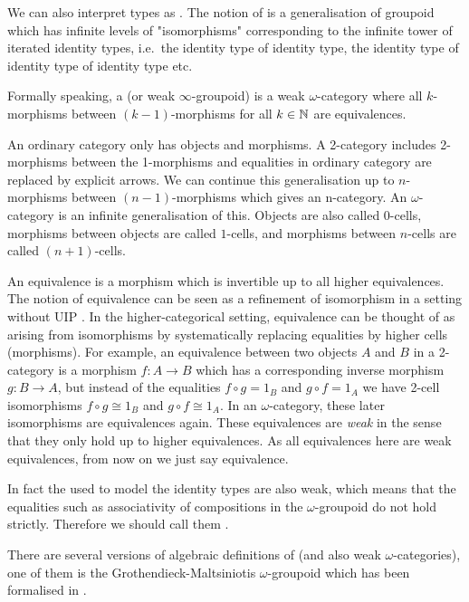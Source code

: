 We can also interpret types as \textbf{\wog}.
The notion of \ogs is a generalisation of groupoid which has infinite levels of "isomorphisms" corresponding to the infinite tower of iterated identity types, i.e.\ the identity type of identity type, the identity type of identity type of identity type etc.

Formally speaking, a \wogs (or weak $\infty$-groupoid) is a weak $\omega$-category where all $k$-morphisms between $(k - 1)$-morphisms for all $k \in \mathbb{N}$ are equivalences. 

An ordinary category only has objects and morphisms. A 2-category includes 2-morphisms between the 1-morphisms and equalities in ordinary category are replaced by explicit arrows. We can continue this generalisation up to $n$-morphisms between $(n-1)$-morphisms which gives an n-category. An $\omega$-category is an infinite generalisation of this. Objects are also called $0$-cells, morphisms between objects are called $1$-cells, and morphisms between $n$-cells are called $(n+1)$-cells.

An equivalence is a morphism which is invertible up to all higher equivalences.
The notion of equivalence can be seen as a refinement of isomorphism in a setting without UIP \cite{txa:csl}. 
In the higher-categorical setting, equivalence can be thought of as arising from isomorphisms by systematically replacing equalities by higher cells (morphisms).
For example, an equivalence 
between two objects $A$ and $B$ in a 2-category is a morphism $f : A \rightarrow B$ which has a
corresponding inverse morphism $ g : B \rightarrow A$, but instead of the
equalities $f ∘ g = 1_B$ and $g ∘ f = 1_A$ we have 2-cell isomorphisms $f ∘ g ≅ 1_B$ and $g ∘ f ≅ 1_A$. In an $\omega$-category, these later isomorphisms are equivalences again.
These equivalences are \emph{weak} in the sense that they only hold up to higher equivalences. 
As all equivalences here are weak equivalences, from now on we just say equivalence.

In fact the \og used to model the identity types are also weak, which means that the equalities such as associativity of compositions in the $\omega$-groupoid do not hold strictly. Therefore we should call them \textbf{\wog}.

There are several versions of algebraic definitions of \wog (and also weak $\omega$-categories), one of them is the Grothendieck-Maltsiniotis $\omega$-groupoid which has been formalised in \cite{mal:gwog}.


